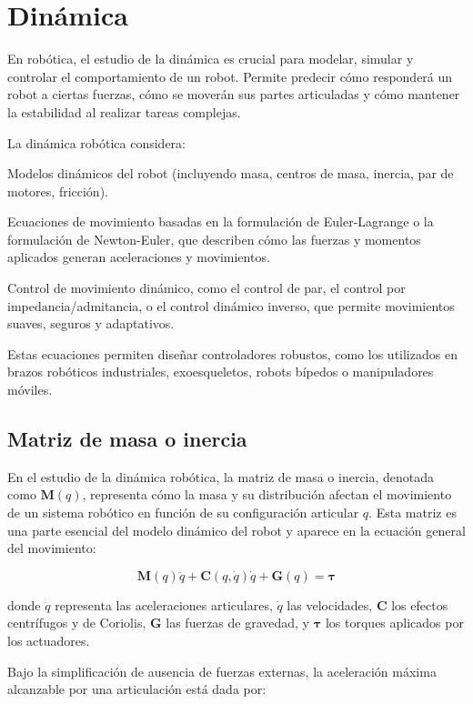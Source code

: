 \section{Dinámica} \label{sec:dinamica}

En robótica, el estudio de la dinámica es crucial para modelar, simular y controlar el comportamiento de un robot. Permite predecir cómo responderá un robot a ciertas fuerzas, cómo se moverán sus partes articuladas y cómo mantener la estabilidad al realizar tareas complejas.

La dinámica robótica considera:

Modelos dinámicos del robot (incluyendo masa, centros de masa, inercia, par de motores, fricción).

Ecuaciones de movimiento basadas en la formulación de Euler-Lagrange o la formulación de Newton-Euler, que describen cómo las fuerzas y momentos aplicados generan aceleraciones y movimientos.

Control de movimiento dinámico, como el control de par, el control por impedancia/admitancia, o el control dinámico inverso, que permite movimientos suaves, seguros y adaptativos.

Estas ecuaciones permiten diseñar controladores robustos, como los utilizados en brazos robóticos industriales, exoesqueletos, robots bípedos o manipuladores móviles.


\subsection{Matriz de masa o inercia}

En el estudio de la dinámica robótica, la matriz de masa o inercia, denotada como $\mathbf{M}(q)$, representa cómo la masa y su distribución afectan el movimiento de un sistema robótico en función de su configuración articular $q$. Esta matriz es una parte esencial del modelo dinámico del robot y aparece en la ecuación general del movimiento:

\[
\mathbf{M}(q)\ddot{q} + \mathbf{C}(q, \dot{q})\dot{q} + \mathbf{G}(q) = \boldsymbol{\tau}
\]

donde $\ddot{q}$ representa las aceleraciones articulares, $\dot{q}$ las velocidades, $\mathbf{C}$ los efectos centrífugos y de Coriolis, $\mathbf{G}$ las fuerzas de gravedad, y $\boldsymbol{\tau}$ los torques aplicados por los actuadores.

Bajo la simplificación de ausencia de fuerzas externas, la aceleración máxima alcanzable por una articulación está dada por:

